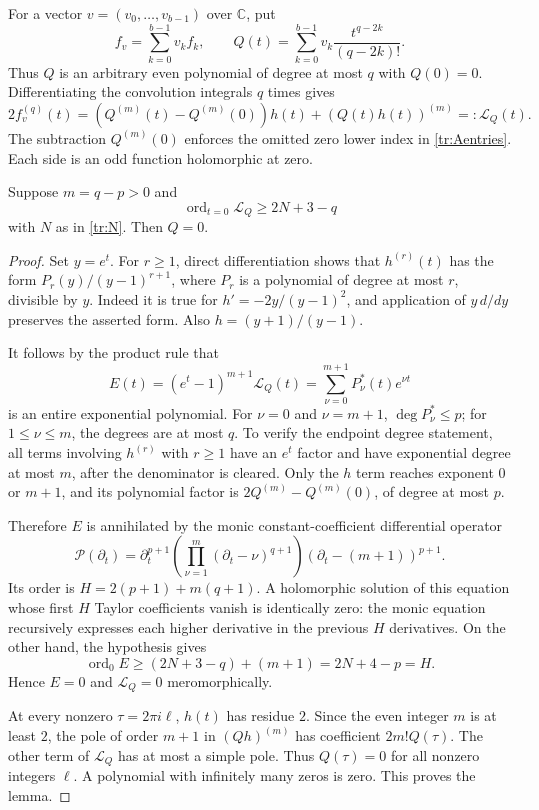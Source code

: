 For a vector $v=(v_0,\ldots,v_{b-1})$ over $\mathbb C$, put
\[
 f_v=\sum_{k=0}^{b-1}v_kf_k,
 \qquad Q(t)=\sum_{k=0}^{b-1}v_k\frac{t^{q-2k}}{(q-2k)!}.
\]
Thus $Q$ is an arbitrary even polynomial of degree at most $q$ with
$Q(0)=0$. Differentiating the convolution integrals $q$ times gives
\begin{equation}\label{tr:operator}
 2f_v^{(q)}(t)
 =\left(Q^{(m)}(t)-Q^{(m)}(0)\right)h(t)
       +(Q(t)h(t))^{(m)}
 =:\mathcal L_Q(t).
\end{equation}
The subtraction $Q^{(m)}(0)$ enforces the omitted zero lower index in
\eqref{tr:Aentries}. Each side is an odd function holomorphic at zero.

\begin{lemma}
\label{tr:zerobound}
Suppose $m=q-p>0$ and
\[
 \operatorname{ord}_{t=0}\mathcal L_Q\ge2N+3-q
\]
with $N$ as in \eqref{tr:N}. Then $Q=0$.
\end{lemma}

\begin{proof}
Set $y=e^t$. For $r\ge1$, direct differentiation shows that
$h^{(r)}(t)$ has the form $P_r(y)/(y-1)^{r+1}$, where $P_r$ is a
polynomial of degree at most $r$, divisible by $y$. Indeed it is true
for $h'=-2y/(y-1)^2$, and application of $y\,d/dy$ preserves the
asserted form. Also $h=(y+1)/(y-1)$.

It follows by the product rule that
\[
 E(t)=(e^t-1)^{m+1}\mathcal L_Q(t)
     =\sum_{\nu=0}^{m+1}P_\nu^*(t)e^{\nu t}
\]
is an entire exponential polynomial. For $\nu=0$ and $\nu=m+1$,
$\deg P_\nu^*\le p$; for $1\le\nu\le m$, the degrees are at most
$q$. To verify the endpoint degree statement, all terms involving
$h^{(r)}$ with $r\ge1$ have an $e^t$ factor and have exponential
degree at most $m$, after the denominator is cleared. Only the
$h$ term reaches exponent $0$ or $m+1$, and its polynomial factor
is $2Q^{(m)}-Q^{(m)}(0)$, of degree at most $p$.

Therefore $E$ is annihilated by the monic constant-coefficient
differential operator
\begin{equation}\label{tr:ode}
 \mathcal P(\partial_t)=
 \partial_t^{p+1}
 \left(\prod_{\nu=1}^{m}(\partial_t-\nu)^{q+1}\right)
 (\partial_t-(m+1))^{p+1}.
\end{equation}
Its order is
$H=2(p+1)+m(q+1)$. A holomorphic solution of this equation whose
first $H$ Taylor coefficients vanish is identically zero: the monic
equation recursively expresses each higher derivative in the previous
$H$ derivatives. On the other hand, the hypothesis gives
\[
 \operatorname{ord}_0E\ge(2N+3-q)+(m+1)
    =2N+4-p=H.
\]
Hence $E=0$ and $\mathcal L_Q=0$ meromorphically.

At every nonzero $\tau=2\pi i\ell$, $h(t)$ has residue $2$.
Since the even integer $m$ is at least $2$, the pole of order $m+1$
in $(Qh)^{(m)}$ has coefficient $2m!Q(\tau)$. The other term of
$\mathcal L_Q$ has at most a simple pole. Thus $Q(\tau)=0$ for all
nonzero integers $\ell$. A polynomial with infinitely many zeros is
zero. This proves the lemma.
\end{proof}

